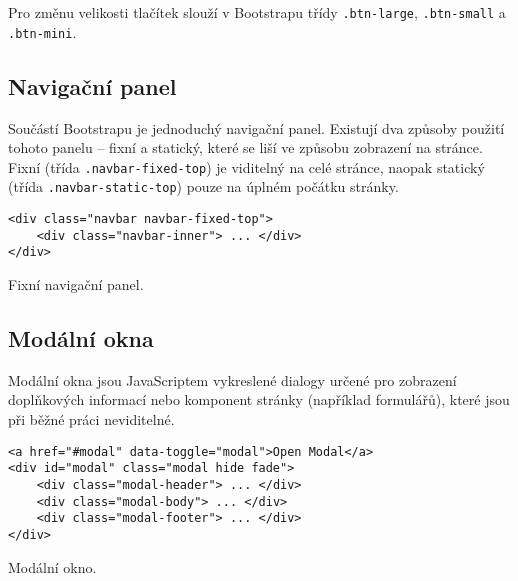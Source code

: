 Pro změnu velikosti tlačítek slouží v Bootstrapu třídy \texttt{.btn-large}, \texttt{.btn-small} a \texttt{.btn-mini}.

\subsection{Navigační panel}

Součástí Bootstrapu je jednoduchý navigační panel. Existují dva způsoby použití tohoto panelu -- fixní a statický, které se liší ve způsobu zobrazení na stránce. Fixní (třída \texttt{.navbar-fixed-top}) je viditelný na celé stránce, naopak statický (třída \texttt{.navbar-static-top}) pouze na úplném počátku stránky.

\begin{example}
    \centering
    \begin{lstlisting}
<div class="navbar navbar-fixed-top">
    <div class="navbar-inner"> ... </div>
</div>
    \end{lstlisting}
    \caption{Fixní navigační panel.}
    \label{example:form}
\end{example}

\subsection{Modální okna}

Modální okna jsou JavaScriptem vykreslené dialogy určené pro zobrazení doplňkových informací nebo komponent stránky (například formulářů), které jsou při běžné práci neviditelné.

\begin{example}
    \centering
    \begin{lstlisting}
<a href="#modal" data-toggle="modal">Open Modal</a>
<div id="modal" class="modal hide fade">
    <div class="modal-header"> ... </div>
    <div class="modal-body"> ... </div>
    <div class="modal-footer"> ... </div>
</div>
    \end{lstlisting}
    \caption{Modální okno.}
    \label{example:form}
\end{example}

